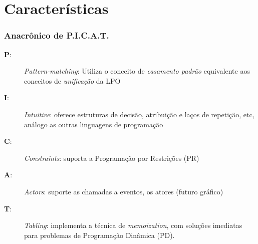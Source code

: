 


\section{Características}
\begin{frame}
    \frametitle{Anacrônico de \textbf{P.I.C.A.T.}}
  
 \begin{description}
   
 
 \item [\textbf{P}:] \textit{Pattern-matching}:  Utiliza o conceito de \textit{casamento padrão}
 equivalente aos conceitos de \textit{unificação} da LPO
 
 \item [\textbf{I}:] \textit{Intuitive}: oferece estruturas de decisão, atribuição e 
 laços de repetição, etc, análogo as outras linguagens de programação
 
  \item [\textbf{C}:] \textit{Constraints}: suporta a Programação por Restrições (PR)
 
     \item [\textbf{A}:] \textit{Actors}: suporte as chamadas a eventos, os atores (futuro gráfico) 
 
  \item [\textbf{T}:] \textit{Tabling}: implementa a técnica de \textit{memoization}, com soluções imediatas para problemas de Programação Dinâmica (PD).
   
  
\end{description}
\end{frame}


